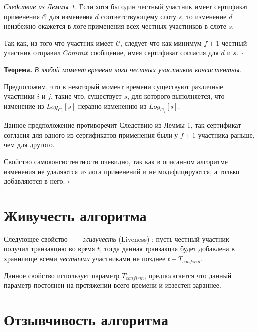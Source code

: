 \textit{Следствие из Леммы 1.} Если хотя бы один честный участник имеет сертификат применения $\mathcal{C}$ для изменения $d$ соответствующему слоту $s$, то  изменение $d$ неизбежно окажется в логе применения всех честных участников в слоте $s$. 

Так как, из того что участник имеет $\mathcal{C}$, следует что как минимум $f+1$ честный участник отправил $Commit$ сообщение, имея сертификат согласия для $d$ и $s$. $\square$
\vspace{10pt}

\textbf{Теорема.} \textit{В любой момент времени логи честных участников консистентны.}

Предположим, что в некоторый момент времени существуют различные участники $i$ и $j$, такие что, существует $s$, для которого выполняется, что изменение из $Log_{C_i}[s]$ неравно изменению из $Log_{C_j}[s]$.

Данное предположение противоречит Следствию из Леммы 1, так сертификат согласия для одного из сертификатов применения были у $f+1$ участника раньше, чем для другого.

Свойство самоконсистентности очевидно, так как в описанном алгоритме изменения не удаляются из лога применений и не модифицируются, а только добавляются в него. $\square$

\section{Живучесть алгоритма}
\noindent Следующее свойство ~--- \textit{живучесть} (Liveness) \cite{hybrid-consensus}:
пусть честный участник получил транзакцию во время $t$, тогда данная транзакция будет добавлена в хранилище всеми \textit{честными} участниками не позднее $t + T_{confirm}$.

Данное свойство использует параметр $T_{confirm}$, предполагается что данный параметр постоянен на протяжении всего времени и известен зараннее.


\section{Отзывчивость алгоритма}